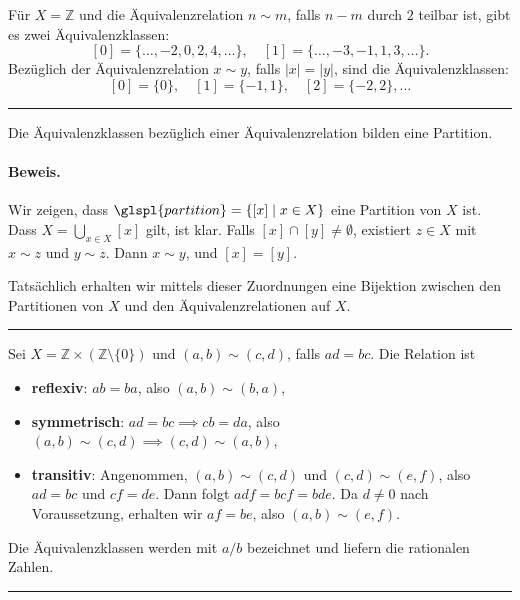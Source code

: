 \documentclass[9pt]{article}
\begin{document}
\begin{bsp}
 Für \( X = \mathbb{Z} \) und die Äquivalenzrelation \( n \sim m \), falls \( n - m \) durch \( 2 \) teilbar ist, gibt es zwei Äquivalenzklassen:
\[
[0] = \{ \dots, -2, 0, 2, 4, \dots \}, \quad
[1] = \{ \dots, -3, -1, 1, 3, \dots \}.
\]
Bezüglich der Äquivalenzrelation \( x \sim y \), falls \( |x| = |y| \), sind die Äquivalenzklassen:
\[
[0] = \{0\}, \quad [1] = \{-1, 1\}, \quad [2] = \{-2, 2\}, \dots
\]
\end{bsp} \noindent \rule{8cm}{0.4pt}

\begin{satz}

Die Äquivalenzklassen bezüglich einer Äquivalenzrelation bilden eine Partition.

\paragraph{Beweis.} Wir zeigen, dass \(\glspl{partition} = \{[x] \mid x \in X\} \) eine Partition von \( X \) ist. Dass \( X = \bigcup_{x \in X} [x] \) gilt, ist klar. Falls \( [x] \cap [y] \neq \emptyset \), existiert \( z \in X \) mit \( x \sim z \) und \( y \sim z \). Dann \( x \sim y \), und \( [x] = [y] \).

Tatsächlich erhalten wir mittels dieser Zuordnungen eine Bijektion zwischen den Partitionen von \( X \) und den Äquivalenzrelationen auf \( X \).
 \end{satz} \noindent \rule{8cm}{0.4pt}

\begin{bsp}
 Sei \( X = \mathbb{Z} \times (\mathbb{Z} \setminus \{0\}) \) und \( (a, b) \sim (c, d) \), falls \( ad = bc \). Die Relation ist
\begin{itemize}
    \item \textbf{reflexiv}: \( ab = ba \), also \( (a, b) \sim (b, a) \),
    \item \textbf{symmetrisch}: \( ad = bc \implies cb = da \), also \( (a, b) \sim (c, d) \implies (c, d) \sim (a, b) \),
    \item \textbf{transitiv}: Angenommen, \( (a, b) \sim (c, d) \) und \( (c, d) \sim (e, f) \), also \( ad = bc \) und \( cf = de \). Dann folgt \( adf = bcf = bde \). Da \( d \neq 0 \) nach Voraussetzung, erhalten wir \( af = be \), also \( (a, b) \sim (e, f) \).
\end{itemize}

Die Äquivalenzklassen werden mit \( a/b \) bezeichnet und liefern die rationalen Zahlen.
\end{bsp} \noindent \rule{8cm}{0.4pt}
\end{document}
